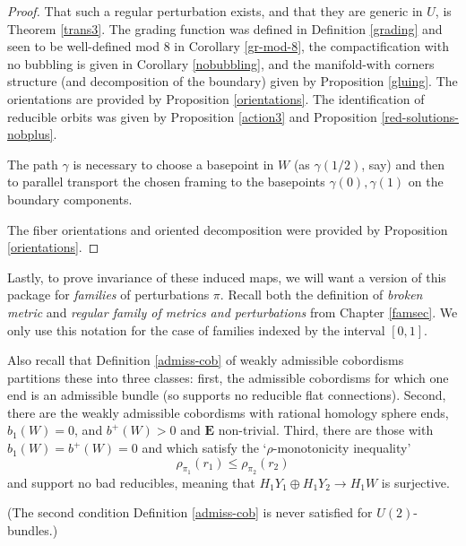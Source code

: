\documentclass{memo-l}
\theoremstyle{definition}
\theoremstyle{remark}
\numberwithin{section}{chapter}
\numberwithin{equation}{chapter}
\begin{document}
\begin{proof}That such a regular perturbation exists, and that they are generic in $U$, is Theorem \ref{trans3}. The grading function was defined in Definition \ref{grading} and seen to be well-defined mod 8 in Corollary \ref{gr-mod-8}, the compactification with no bubbling is given in Corollary \ref{nobubbling}, and the manifold-with corners structure (and decomposition of the boundary) given by Proposition \ref{gluing}. The orientations are provided by Proposition \ref{orientations}. The identification of reducible orbits was given by Proposition \ref{action3} and Proposition \ref{red-solutions-nobplus}.

The path $\gamma$ is necessary to choose a basepoint in $W$ (as $\gamma(1/2)$, say) and then to parallel transport the chosen framing to the basepoints $\gamma(0), \gamma(1)$ on the boundary components.

The fiber orientations and oriented decomposition were provided by Proposition \ref{orientations}.
\end{proof}

Lastly, to prove invariance of these induced maps, we will want a version of this package for \emph{families} of perturbations $\pi$. Recall both the definition of \emph{broken metric} and \emph{regular family of metrics and perturbations} from Chapter \ref{famsec}. We only use this notation for the case of families indexed by the interval $[0,1]$. 

Also recall that Definition \ref{admiss-cob} of weakly admissible cobordisms partitions these into three classes: first, the admissible cobordisms for which one end is an admissible bundle (so supports no reducible flat connections). Second, there are the weakly admissible cobordisms with rational homology sphere ends, $b_1(W) = 0$, and $b^+(W) > 0$ and $\mathbf{E}$ non-trivial. Third, there are those with $b_1(W) = b^+(W) = 0$ and which satisfy the `$\rho$-monotonicity inequality' 
$$\rho_{\pi_1}(r_1) \leq \rho_{\pi_2}(r_2)$$ and support no bad reducibles, meaning that $H_1 Y_1 \oplus H_1 Y_2 \to H_1 W$ is surjective.

(The second condition Definition \ref{admiss-cob} is never satisfied for $U(2)$-bundles.)
\end{document}
